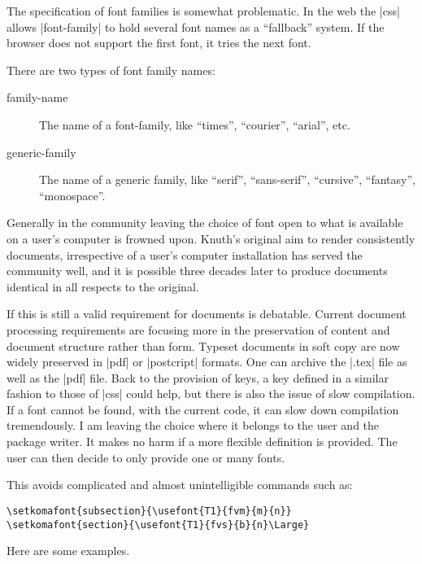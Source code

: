 The specification of font families is somewhat problematic. In the web the |css| allows |font-family|  to hold several font names as a ``fallback” system. If the browser does not support the first font, it tries the next font.

There are two types of font family names:

\begin{description}
\item[family-name] The name of a font-family, like “times”, “courier”, “arial”, etc.
\item[generic-family] The name of a generic family, like “serif”, “sans-serif”, “cursive”, “fantasy”, “monospace”.
\end{description}

Generally in the \tex community leaving the choice of font  open to what is available on a user’s computer is frowned upon. Knuth’s original aim to render consistently documents, irrespective of a user’s computer installation has served the community well, and it is possible three decades later to produce documents identical in all respects to the original. 

If this is still a valid requirement for documents is debatable. Current document processing requirements are focusing more in the preservation of content and document structure rather than form. Typeset documents in soft copy are now widely preserved in |pdf| or |postcript|  formats. One can archive the |.tex| file as well as the |pdf| file.  Back to the provision of keys, a key defined in a 
similar fashion to those of |css| could help, but there is also the issue of slow compilation. If a font cannot be
found, with the current code, it can slow down compilation tremendously. I am leaving the choice where it belongs to the user and the package writer. It makes no harm if a more flexible definition is provided. The user can then decide to only provide one or many fonts. 

This avoids complicated and almost unintelligible commands such as:

\begin{verbatim}
\setkomafont{subsection}{\usefont{T1}{fvm}{m}{n}}
\setkomafont{section}{\usefont{T1}{fvs}{b}{n}\Large}
\end{verbatim}

Here are some examples. 

